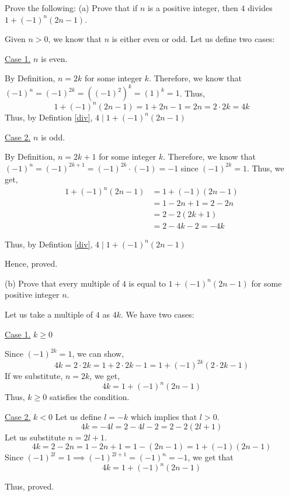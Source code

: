 \begin{problem}
	Prove the following:
	\bigbreak
	(a) Prove that if $n$ is a positive integer, then $4$ divides $1 + (-1)^n(2n-1)$.
	\begin{solution}
		Given $n > 0$, we know that $n$ is either even or odd. Let us define two cases:

		\underline{Case 1.} $n$ is even.

		By Definition, $n = 2k$ for some integer $k$. 
		Therefore, we know that $(-1)^n = (-1)^{2k} = ((-1)^2)^k = (1)^k = 1$. Thus, 
		$$1 + (-1)^n(2n-1) = 1 + 2n-1 = 2n = 2 \cdot 2k = 4k$$
		Thus, by Defintion \ref{div}, $4 \mid 1 + (-1)^n(2n-1)$
		
		\underline{Case 2.} $n$ is odd.

		By Definition, $n = 2k+1$ for some integer $k$. 
		Therefore, we know that $(-1)^n = (-1)^{2k+1} = (-1)^{2k} \cdot (-1) = -1$ since $(-1)^{2k} = 1$.
		Thus, we get,
		\begin{align}
			1 + (-1)^n(2n-1) &= 1 + (-1)(2n-1) \\
											 &= 1 - 2n + 1 = 2 - 2n \\
											 &= 2 - 2(2k+1) \\
											 &= 2 - 4k - 2 = -4k
		\end{align}

		Thus, by Defintion \ref{div}, $4 \mid 1 + (-1)^n(2n-1)$


		Hence, proved.
	\end{solution}

	(b) Prove that every multiple of $4$ is equal to $1 + (-1)^n(2n-1)$ for some positive integer $n$.
	\begin{solution}
		Let us take a multiple of $4$ as $4k$. We have two cases:
		
		\underline{Case 1.} $k \geq 0$

		Since $(-1)^{2k} = 1$, we can show,
		$$4k = 2 \cdot 2k = 1 + 2 \cdot 2k - 1 = 1 + (-1)^{2k}(2 \cdot 2k - 1)$$
		If we substitute, $n = 2k$, we get, 
		$$4k = 1 + (-1)^n(2n-1)$$
		Thus, $k \geq 0$ satisfies the condition.

		\underline{Case 2.} $k < 0$
		Let us define $l = -k$ which implies that $l > 0$.
		$$4k = -4l =  2 - 4l - 2 = 2 - 2(2l+1)$$
		Let us substitute $n = 2l+1$.
		$$4k = 2 - 2n = 1 - 2n + 1 = 1 - (2n-1) = 1 + (-1)(2n-1)$$
		Since $(-1)^{2l} = 1 \implies (-1)^{2l+1} = (-1)^n = -1$, we get that
		$$4k = 1 + (-1)^n(2n-1)$$

		Thus, proved.
	\end{solution}
\end{problem}


